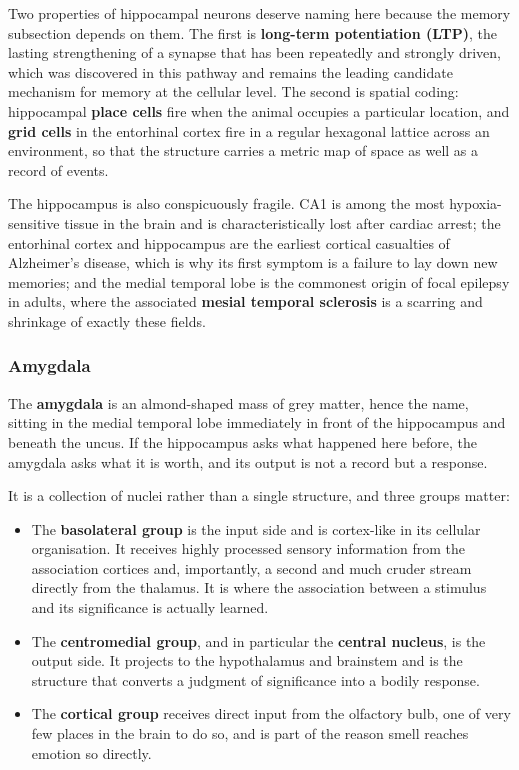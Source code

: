 \documentclass[11pt]{article}
\begin{document}
Two properties of hippocampal neurons deserve naming here because the memory subsection depends on them. The first is \textbf{long-term potentiation (LTP)}, the lasting strengthening of a synapse that has been repeatedly and strongly driven, which was discovered in this pathway and remains the leading candidate mechanism for memory at the cellular level. The second is spatial coding: hippocampal \textbf{place cells} fire when the animal occupies a particular location, and \textbf{grid cells} in the entorhinal cortex fire in a regular hexagonal lattice across an environment, so that the structure carries a metric map of space as well as a record of events.

The hippocampus is also conspicuously fragile. CA1 is among the most hypoxia-sensitive tissue in the brain and is characteristically lost after cardiac arrest; the entorhinal cortex and hippocampus are the earliest cortical casualties of Alzheimer's disease, which is why its first symptom is a failure to lay down new memories; and the medial temporal lobe is the commonest origin of focal epilepsy in adults, where the associated \textbf{mesial temporal sclerosis} is a scarring and shrinkage of exactly these fields.

\subsubsection{Amygdala}

The \textbf{amygdala} is an almond-shaped mass of grey matter, hence the name, sitting in the medial temporal lobe immediately in front of the hippocampus and beneath the uncus. If the hippocampus asks what happened here before, the amygdala asks what it is worth, and its output is not a record but a response.

It is a collection of nuclei rather than a single structure, and three groups matter:

\begin{itemize}
    \item The \textbf{basolateral group} is the input side and is cortex-like in its cellular organisation. It receives highly processed sensory information from the association cortices and, importantly, a second and much cruder stream directly from the thalamus. It is where the association between a stimulus and its significance is actually learned.
    \item The \textbf{centromedial group}, and in particular the \textbf{central nucleus}, is the output side. It projects to the hypothalamus and brainstem and is the structure that converts a judgment of significance into a bodily response.
    \item The \textbf{cortical group} receives direct input from the olfactory bulb, one of very few places in the brain to do so, and is part of the reason smell reaches emotion so directly.
\end{itemize}
\end{document}
